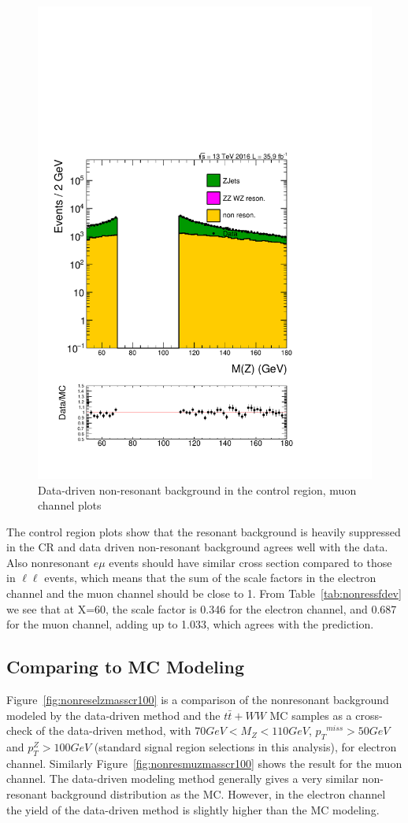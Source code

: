 \begin{figure}[htbp]
\begin{center}
\includegraphics[width=0.39\linewidth, page=4]{figures/test_metzpt50_RhoWt_puWeight68075_metfilter_mu_.pdf}
\caption{Data-driven non-resonant background in the control region, muon channel plots}
\label{fig:nonresmucr}
\end{center}
\end{figure}

\vspace{0.3cm}
The control region plots show that the resonant background is heavily suppressed in the CR and data driven non-resonant background agrees well with the data. Also nonresonant $e\mu$ events should have similar cross section compared to those in $\ell\ell$ events, which means that the sum of the scale factors in the electron channel and the muon channel should be close to 1. From Table~\ref{tab:nonressfdev} we see that at X=60, the scale factor is 0.346 for the electron channel, and 0.687 for the muon channel, adding up to 1.033, which agrees with the prediction.

\subsection{Comparing to MC Modeling}
Figure~\ref{fig:nonreselzmasscr100} is a comparison of the nonresonant background modeled by the data-driven method and the $t\bar{t}+WW$ MC samples as a cross-check of the data-driven method, with $70GeV<M_{Z}<110GeV$, ${p_{T}}^{miss}>50GeV$ and $p_{T}^{Z}>100GeV$ (standard signal region selections in this analysis), for electron channel. Similarly Figure~\ref{fig:nonresmuzmasscr100} shows the result for the muon channel. The data-driven modeling method generally gives a very similar non-resonant background distribution as the MC. However, in the electron channel the yield of the data-driven method is slightly higher than the MC modeling.

